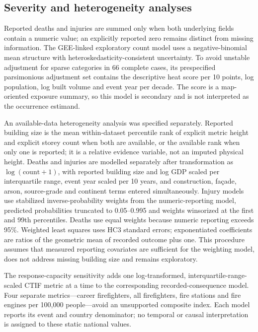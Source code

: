 \documentclass[11pt]{article}
\begin{document}
\subsection*{Severity and heterogeneity analyses}
Reported deaths and injuries are summed only when both underlying fields contain a numeric value; an explicitly reported zero remains distinct from missing information. The GEE-linked exploratory count model uses a negative-binomial mean structure with heteroskedasticity-consistent uncertainty. To avoid unstable adjustment for sparse categories in 66 complete cases, its prespecified parsimonious adjustment set contains the descriptive heat score per 10 points, log population, log built volume and event year per decade. The score is a map-oriented exposure summary, so this model is secondary and is not interpreted as the occurrence estimand.

An available-data heterogeneity analysis was specified separately. Reported building size is the mean within-dataset percentile rank of explicit metric height and explicit storey count when both are available, or the available rank when only one is reported; it is a relative evidence variable, not an imputed physical height. Deaths and injuries are modelled separately after transformation as $\log(\mathrm{count}+1)$, with reported building size and log GDP scaled per interquartile range, event year scaled per 10 years, and construction, façade, arson, source-grade and continent terms entered simultaneously. Injury models use stabilized inverse-probability weights from the numeric-reporting model\citep{Cole2008}, predicted probabilities truncated to 0.05--0.995 and weights winsorized at the first and 99th percentiles. Deaths use equal weights because numeric reporting exceeds 95\%. Weighted least squares uses HC3 standard errors; exponentiated coefficients are ratios of the geometric mean of recorded outcome plus one. This procedure assumes that measured reporting covariates are sufficient for the weighting model, does not address missing building size and remains exploratory.

The response-capacity sensitivity adds one log-transformed, interquartile-range-scaled CTIF metric at a time to the corresponding recorded-consequence model. Four separate metrics---career firefighters, all firefighters, fire stations and fire engines per 100,000 people---avoid an unsupported composite index. Each model reports its event and country denominator; no temporal or causal interpretation is assigned to these static national values.
\end{document}
